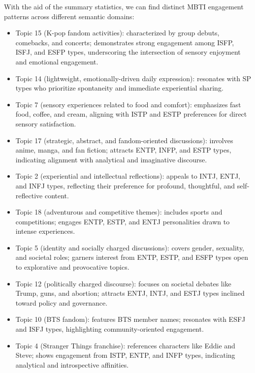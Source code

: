 \documentclass[12pt]{article}
\numberwithin{figure}{section}  %
\begin{document}
	 With the aid of the summary statistics, we can find distinct MBTI
	 engagement patterns across different semantic domains:
	\begin{itemize}
	\item Topic 15 (K-pop fandom activities): characterized by group debuts,
	comebacks, and concerts; demonstrates strong engagement among ISFP, ISFJ,
	and ESFP types, underscoring the intersection of sensory enjoyment and
	emotional engagement.
	\item Topic 14 (lightweight, emotionally-driven daily expression): resonates
	with SP types who prioritize spontaneity and immediate experiential sharing.
	\item Topic 7 (sensory experiences related to food and comfort): emphasizes
	fast food, coffee, and cream, aligning with ISTP and ESTP preferences for
	direct sensory satisfaction.
	\item Topic 17 (strategic, abstract, and fandom-oriented discussions):
	involves anime, manga, and fan fiction; attracts ENTP, INFP, and ESTP types,
	indicating alignment with analytical and imaginative discourse.
	\item Topic 2 (experiential and intellectual reflections): appeals to INTJ,
	ENTJ, and INFJ types, reflecting their preference for profound, thoughtful,
	and self-reflective content.
	\item Topic 18 (adventurous and competitive themes): includes sports and
	competitions; engages ENTP, ESTP, and ENTJ personalities drawn to intense
	experiences.
	\item Topic 5 (identity and socially charged discussions): covers gender,
	sexuality, and societal roles; garners interest from ENTP, ESTP, and ESFP
	types open to explorative and provocative topics.
	\item Topic 12 (politically charged discourse): focuses on societal debates
	like Trump, guns, and abortion; attracts ENTJ, INTJ, and ESTJ types inclined
	toward policy and governance.
	\item Topic 10 (BTS fandom): features BTS member names; resonates with ESFJ
	and ISFJ types, highlighting community-oriented engagement.
	\item Topic 4 (Stranger Things franchise): references characters like Eddie
	and Steve; shows engagement from ISTP, ENTP, and INFP types, indicating
	analytical and introspective affinities.
	\end{itemize}
	
\end{document}
